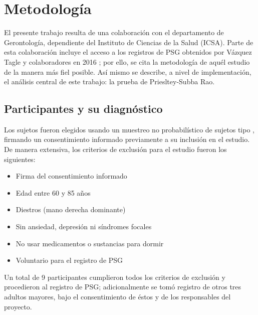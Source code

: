 
\chapter{Metodología}

El presente trabajo resulta de una colaboración con el departamento de Gerontología, dependiente 
del Instituto de Ciencias de la Salud (ICSA).
Parte de esta colaboración incluye el acceso a los registros de PSG obtenidos por Vázquez Tagle 
y colaboradores en 2016 \cite{VazquezTagle16}; por ello, se cita la metodología de aquél estudio 
de la manera más fiel posible.
Así mismo se describe, a nivel de implementación, el análisis central de este trabajo: la prueba 
de Priesltey-Subba Rao. 


\section{Participantes y su diagnóstico}

Los sujetos fueron elegidos usando un muestreo no probabilístico de sujetos tipo \cite{Garcia09},
firmando un consentimiento informado previamente a su inclusión en el estudio. 
De manera extensiva, los criterios de exclusión para el estudio fueron los siguientes:
\begin{itemize}
\item Firma del consentimiento informado
\item Edad entre 60 y 85 años
\item Diestros (mano derecha dominante)
\item Sin ansiedad, depresión ni síndromes focales
\item No usar medicamentos o sustancias para dormir
\item Voluntario para el registro de PSG
\end{itemize}

Un total de 9 participantes cumplieron todos los criterios de exclusión y procedieron al registro 
de PSG; adicionalmente se tomó registro de otros tres adultos mayores, bajo el consentimiento de 
éstos y de los responsables del proyecto.

